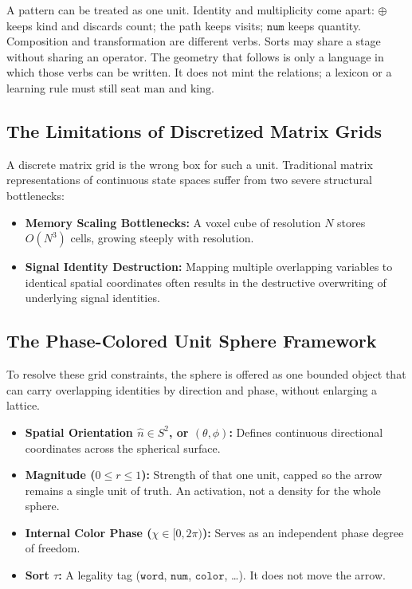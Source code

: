 \documentclass[12pt, a4paper]{article}
\begin{document}
A pattern can be treated as one unit. Identity and multiplicity come
apart: $\oplus$ keeps kind and discards count; the path keeps visits;
$\mathtt{num}$ keeps quantity. Composition and transformation are
different verbs. Sorts may share a stage without sharing an operator.
The geometry that follows is only a language in which those verbs can
be written. It does not mint the relations; a lexicon or a learning
rule must still seat $\mathrm{man}$ and $\mathrm{king}$.

\subsection{The Limitations of Discretized Matrix Grids}
A discrete matrix grid is the wrong box for such a unit. Traditional matrix representations of continuous state spaces suffer from two severe structural bottlenecks:
\begin{itemize}
    \item \textbf{Memory Scaling Bottlenecks:} A voxel cube of resolution $N$ stores $O(N^3)$ cells, growing steeply with resolution.
    \item \textbf{Signal Identity Destruction:} Mapping multiple overlapping variables to identical spatial coordinates often results in the destructive overwriting of underlying signal identities.
\end{itemize}

\subsection{The Phase-Colored Unit Sphere Framework}
To resolve these grid constraints, the sphere is offered as one bounded object that can carry overlapping identities by direction and phase, without enlarging a lattice.
\begin{itemize}
    \item \textbf{Spatial Orientation $\hat n \in S^2$, or $(\theta, \phi)$:} Defines continuous directional coordinates across the spherical surface.
    \item \textbf{Magnitude ($0 \leq r \leq 1$):} Strength of that one unit, capped so the arrow remains a single unit of truth. An activation, not a density for the whole sphere.
    \item \textbf{Internal Color Phase ($\chi \in [0, 2\pi)$):} Serves as an independent phase degree of freedom.
    \item \textbf{Sort $\tau$:} A legality tag ($\mathtt{word}$, $\mathtt{num}$, $\mathtt{color}$, \ldots). It does not move the arrow.
\end{itemize}
\end{document}
